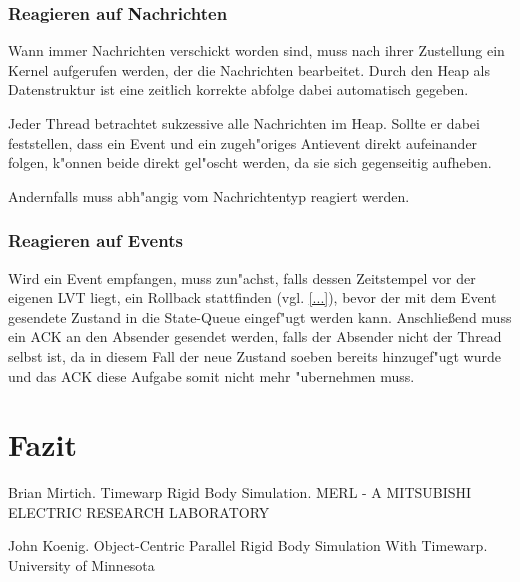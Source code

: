 \documentclass[a4paper, 10pt, openright, parskip, chapterprefix]{scrreprt}
\begin{document}
\subsection{Reagieren auf Nachrichten}
Wann immer Nachrichten verschickt worden sind, muss nach ihrer Zustellung ein Kernel aufgerufen werden, der die
Nachrichten bearbeitet. Durch den Heap als Datenstruktur ist eine zeitlich korrekte abfolge dabei automatisch gegeben.

Jeder Thread betrachtet sukzessive alle Nachrichten im Heap. Sollte er dabei feststellen, dass ein Event und ein
zugeh"origes Antievent direkt aufeinander folgen, k"onnen beide direkt gel"oscht werden, da sie sich gegenseitig
aufheben.

Andernfalls muss abh"angig vom Nachrichtentyp reagiert werden.

\subsection{Reagieren auf Events}
Wird ein Event empfangen, muss zun"achst, falls dessen Zeitstempel vor der eigenen LVT liegt, 
ein Rollback stattfinden (vgl. \ref{...}), bevor der mit dem Event gesendete
Zustand in die State-Queue eingef"ugt werden kann. Anschlie\ss end muss ein ACK an den Absender gesendet werden, falls
der Absender nicht der Thread selbst ist, da in diesem Fall der neue Zustand soeben
bereits hinzugef"ugt wurde und das ACK diese Aufgabe somit nicht mehr "ubernehmen muss.



\chapter{Fazit}
\begin{thebibliography}{10}
Brian Mirtich. Timewarp Rigid Body Simulation. MERL - A MITSUBISHI ELECTRIC RESEARCH LABORATORY

John Koenig. Object-Centric Parallel Rigid Body Simulation With Timewarp. University of Minnesota
\end{thebibliography}
\end{document}
